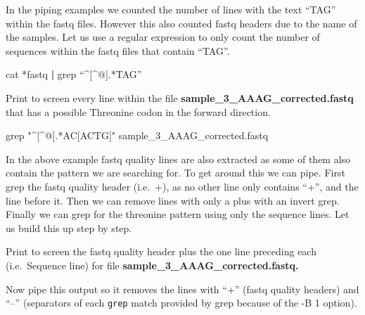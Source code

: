 \documentclass[
  letterpaper,
  DIV=11,
  numbers=noendperiod]{scrreprt}
\newenvironment{Shaded}{\begin{snugshade}}{\end{snugshade}}
\newcommand{\AttributeTok}[1]{\textcolor[rgb]{0.40,0.45,0.13}{#1}}
\newcommand{\FunctionTok}[1]{\textcolor[rgb]{0.28,0.35,0.67}{#1}}
\newcommand{\KeywordTok}[1]{\textcolor[rgb]{0.00,0.23,0.31}{\textbf{#1}}}
\newcommand{\NormalTok}[1]{\textcolor[rgb]{0.00,0.23,0.31}{#1}}
\newcommand{\PreprocessorTok}[1]{\textcolor[rgb]{0.68,0.00,0.00}{#1}}
\newcommand{\SpecialStringTok}[1]{\textcolor[rgb]{0.13,0.47,0.30}{#1}}
\newcommand{\StringTok}[1]{\textcolor[rgb]{0.13,0.47,0.30}{#1}}
\begin{document}
In the piping examples we counted the number of lines with the text
``TAG'' within the fastq files. However this also counted fastq headers
due to the name of the samples. Let us use a regular expression to only
count the number of sequences within the fastq files that contain
``TAG''.

\begin{Shaded}
\begin{Highlighting}[]
\FunctionTok{cat} \PreprocessorTok{*}\NormalTok{fastq }\KeywordTok{|} \FunctionTok{grep}\NormalTok{ “\^{}}\PreprocessorTok{[\^{}}\SpecialStringTok{@}\PreprocessorTok{]}\NormalTok{.}\PreprocessorTok{*}\NormalTok{TAG”}
\end{Highlighting}
\end{Shaded}

Print to screen every line within the file
\textbf{sample\_3\_AAAG\_corrected.fastq} that has a possible Threonine
codon in the forward direction.

\begin{Shaded}
\begin{Highlighting}[]
\FunctionTok{grep} \StringTok{"\^{}[\^{}@].*AC[ACTG]"}\NormalTok{ sample\_3\_AAAG\_corrected.fastq}
\end{Highlighting}
\end{Shaded}

In the above example fastq quality lines are also extracted as some of
them also contain the pattern we are searching for. To get around this
we can pipe. First grep the fastq quality header (i.e.~+), as no other
line only contains ``+'', and the line before it. Then we can remove
lines with only a plus with an invert grep. Finally we can grep for the
threonine pattern using only the sequence lines. Let us build this up
step by step.

Print to screen the fastq quality header plus the one line preceding
each (i.e.~Sequence line) for file
\textbf{sample\_3\_AAAG\_corrected.fastq.}

\begin{Shaded}
\end{Shaded}

Now pipe this output so it removes the lines with ``+'' (fastq quality
headers) and ``--'' (separators of each \texttt{grep} match provided by
grep because of the -B 1 option).
\end{document}

